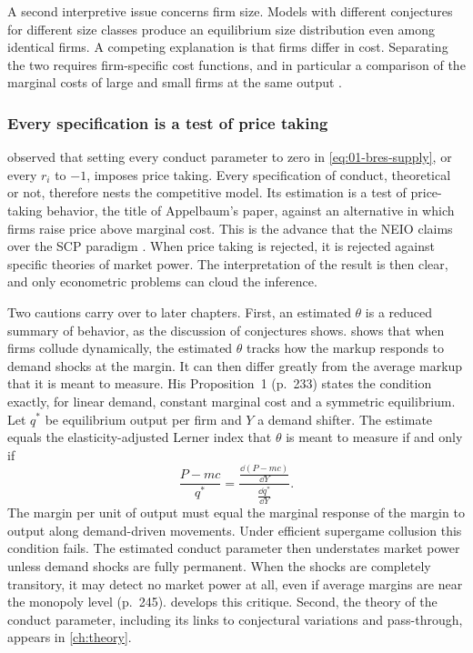 A second interpretive issue concerns firm size. Models with different conjectures for different size classes produce
an equilibrium size distribution even among identical firms. A competing explanation is that firms differ in cost.
Separating the two requires firm-specific cost functions, and in particular a comparison of the marginal costs of large
and small firms at the same output \citep[p.~1030 and fn.~20]{Bresnahan1989}.

\subsubsection{Every specification is a test of price taking}\label{sec:01-appelbaum}

\citet{Appelbaum1979} observed that setting every conduct parameter to zero in \eqref{eq:01-bres-supply}, or every
$r_i$ to $-1$, imposes price taking. Every specification of conduct, theoretical or not, therefore nests the
competitive model. Its estimation is a test of price-taking behavior, the title of Appelbaum's paper, against an
alternative in which firms raise price above marginal cost. This is the advance that the NEIO claims over the SCP
paradigm \citep[p.~1031]{Bresnahan1989}. When price taking is rejected, it is rejected against specific theories of
market power. The interpretation of the result is then clear, and only econometric problems can cloud the inference.

Two cautions carry over to later chapters. First, an estimated $\theta$ is a reduced summary of behavior, as the
discussion of conjectures shows. \citet{Corts1999} shows that when firms collude dynamically, the estimated $\theta$
tracks how the markup responds to demand shocks at the margin. It can then differ greatly from the average markup that
it is meant to measure. His Proposition~1 (p.~233) states the condition exactly, for linear demand, constant
marginal cost and a symmetric equilibrium. Let $q^*$ be equilibrium output per firm and $Y$ a demand shifter. The
estimate equals the elasticity-adjusted Lerner index that $\theta$ is meant to measure if and only if
\[
\frac{P - mc}{q^*} = \frac{\frac{\dd (P - mc)}{\dd Y}}{\frac{\dd q^*}{\dd Y}} .
\]
The margin per unit of output must equal the marginal response of the margin to output along demand-driven
movements. Under efficient supergame collusion this condition fails. The estimated conduct parameter then
understates market power unless demand shocks are fully permanent. When the shocks are completely transitory, it
may detect no market power at all, even if average margins are near the monopoly level (p.~245).
 develops this critique. Second, the theory of the conduct parameter, including
its links to conjectural variations and pass-through, appears in \cref{ch:theory}.

